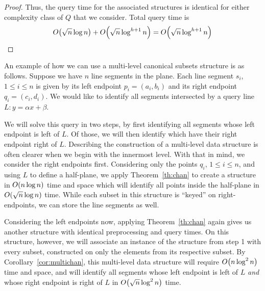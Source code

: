 \begin{proof}
Thus, the query time for the associated structures is identical for either complexity class of $Q$ that we consider. Total query time is
\[
O\!\left(\sqrt{n}\log{n}\right) + O\!\left(\sqrt{n}\log^{h+1}{n}\right) = O\!\left(\sqrt{n}\log^{h+1}{n}\right)
\]

\end{proof}

An example of how we can use a multi-level canonical subsets structure is as follows. 
Suppose we have $n$ line segments in the plane.
Each line segment $s_i$, $1 \leq i \leq n$ is given by its left endpoint $p_i = (a_i, b_i)$ and its right endpoint $q_i = (c_i, d_i)$.
We would like to identify all segments intersected by a query line $L: y = \alpha x + \beta$.

We will solve this query in two steps, by first identifying all segments whose left endpoint is left of $L$. 
Of those, we will then identify which have their right endpoint right of $L$.
Describing the construction of a multi-level data structure is often clearer when we begin with the innermost level.
With that in mind, we consider the right endpoints first. 
Considering only the points $q_i$, $1 \leq i \leq n$, and using $L$ to define a half-plane, we apply 
Theorem~\ref{th:chan} to create a structure in $O\!\left(n\log{n}\right)$ time and space which will identify all points inside the half-plane in $O\!\left(\sqrt{n}\log{n}\right)$ time.  While each subset in this structure is ``keyed'' on right-endpoints, we can store the line segments as well.

Considering the left endpoints now, applying Theorem~\ref{th:chan} again gives us another structure with identical preprocessing and query times.  On this structure, however, we will associate an instance of the structure from step 1 with every subset, constructed on only the elements from its respective subset. By Corollary~\ref{cor:multichan}, this multi-level data structure will require $O\!\left(n\log^2{n}\right)$ time and space, and will identify all segments whose left endpoint is left of $L$ \emph{and} whose right endpoint is right of $L$ in $O\!\left(\sqrt{n}\log^2{n}\right)$ time.
